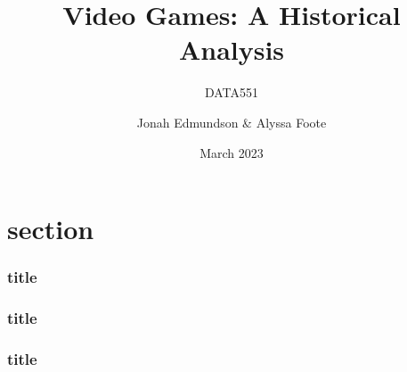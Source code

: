 \documentclass{beamer}
\title{Video Games: A Historical Analysis}
\subtitle{DATA551}
\author{Jonah Edmundson \& Alyssa Foote}
\institute{UBCO}
\date{March 2023}
\begin{document}
\begin{frame}
\titlepage
\end{frame}


\section{section}


\begin{frame}
\frametitle{title}
\centering
\end{frame}


\begin{frame}
\frametitle{title}
\centering
\end{frame}

\begin{frame}
\frametitle{title}
\centering
\end{frame}
\end{document}

